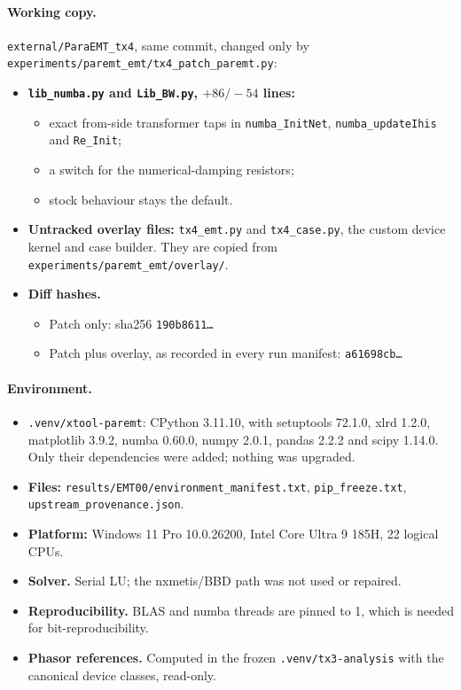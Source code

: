 \documentclass[10pt,a4paper]{article}
\newcommand{\f}[1]{\nolinkurl{#1}}
\begin{document}
\paragraph{Working copy.} \f{external/ParaEMT_tx4}, same commit, changed only
by \f{experiments/paremt_emt/tx4_patch_paremt.py}:
\begin{itemize}
\item \textbf{\f{lib_numba.py} and \f{Lib_BW.py}, $+86/-54$ lines:}
  \begin{itemize}
  \item exact from-side transformer taps in \texttt{numba\_InitNet},
    \texttt{numba\_updateIhis} and \texttt{Re\_Init};
  \item a switch for the numerical-damping resistors;
  \item stock behaviour stays the default.
  \end{itemize}
\item \textbf{Untracked overlay files:} \f{tx4_emt.py} and \f{tx4_case.py}, the
  custom device kernel and case builder. They are copied from
  \f{experiments/paremt_emt/overlay/}.
\item \textbf{Diff hashes.}
  \begin{itemize}
  \item Patch only: sha256 \texttt{190b8611\ldots}
  \item Patch plus overlay, as recorded in every run manifest:
    \texttt{a61698cb\ldots}
  \end{itemize}
\end{itemize}

\paragraph{Environment.}
\begin{itemize}
\item \f{.venv/xtool-paremt}: CPython 3.11.10, with setuptools 72.1.0, xlrd
  1.2.0, matplotlib 3.9.2, numba 0.60.0, numpy 2.0.1, pandas 2.2.2 and scipy
  1.14.0. Only their dependencies were added; nothing was upgraded.
\item \textbf{Files:} \f{results/EMT00/environment_manifest.txt},
  \f{pip_freeze.txt}, \f{upstream_provenance.json}.
\item \textbf{Platform:} Windows 11 Pro 10.0.26200, Intel Core Ultra 9 185H,
  22 logical CPUs.
\item \textbf{Solver.} Serial LU; the nxmetis/BBD path was not used or
  repaired.
\item \textbf{Reproducibility.} BLAS and numba threads are pinned to 1, which
  is needed for bit-reproducibility.
\item \textbf{Phasor references.} Computed in the frozen
  \f{.venv/tx3-analysis} with the canonical device classes, read-only.
\end{itemize}
\end{document}

